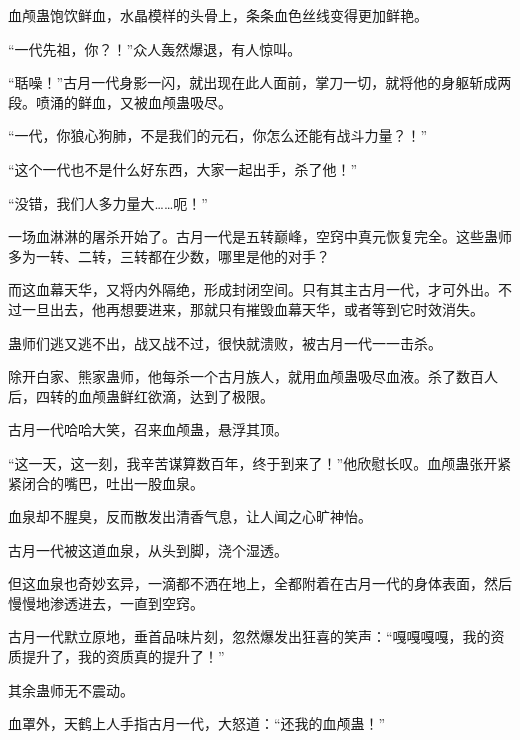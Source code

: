 \begin{this_body}
血颅蛊饱饮鲜血，水晶模样的头骨上，条条血色丝线变得更加鲜艳。

“一代先祖，你？！”众人轰然爆退，有人惊叫。

“聒噪！”古月一代身影一闪，就出现在此人面前，掌刀一切，就将他的身躯斩成两段。喷涌的鲜血，又被血颅蛊吸尽。

“一代，你狼心狗肺，不是我们的元石，你怎么还能有战斗力量？！”

“这个一代也不是什么好东西，大家一起出手，杀了他！”

“没错，我们人多力量大……呃！”

一场血淋淋的屠杀开始了。古月一代是五转巅峰，空窍中真元恢复完全。这些蛊师多为一转、二转，三转都在少数，哪里是他的对手？

而这血幕天华，又将内外隔绝，形成封闭空间。只有其主古月一代，才可外出。不过一旦出去，他再想要进来，那就只有摧毁血幕天华，或者等到它时效消失。

蛊师们逃又逃不出，战又战不过，很快就溃败，被古月一代一一击杀。

除开白家、熊家蛊师，他每杀一个古月族人，就用血颅蛊吸尽血液。杀了数百人后，四转的血颅蛊鲜红欲滴，达到了极限。

古月一代哈哈大笑，召来血颅蛊，悬浮其顶。

“这一天，这一刻，我辛苦谋算数百年，终于到来了！”他欣慰长叹。血颅蛊张开紧紧闭合的嘴巴，吐出一股血泉。

血泉却不腥臭，反而散发出清香气息，让人闻之心旷神怡。

古月一代被这道血泉，从头到脚，浇个湿透。

但这血泉也奇妙玄异，一滴都不洒在地上，全都附着在古月一代的身体表面，然后慢慢地渗透进去，一直到空窍。

古月一代默立原地，垂首品味片刻，忽然爆发出狂喜的笑声：“嘎嘎嘎嘎，我的资质提升了，我的资质真的提升了！”

其余蛊师无不震动。

血罩外，天鹤上人手指古月一代，大怒道：“还我的血颅蛊！”

\end{this_body}

